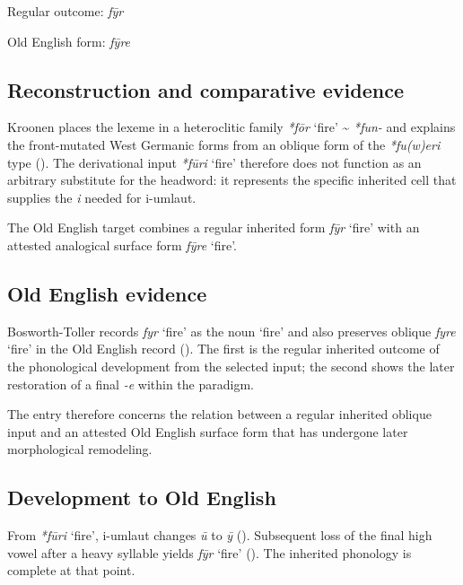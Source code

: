 \documentclass[
  british,
  a4paper,
  openany]{book}
\providecommand{\Recon}[1]{\emph{*#1}}
{\catcode`→=\active \global\def→{\ensuremath{\rightarrow}}}
\providecommand{\Recon}[1]{\emph{*#1}}
{\catcode`→=\active \global\def→{\ensuremath{\rightarrow}}}
\begin{document}
Regular outcome: \emph{fȳr}

Old English form: \emph{fȳre}

\subsection{Reconstruction and comparative
evidence}\label{reconstruction-and-comparative-evidence-140}

Kroonen places the lexeme in a heteroclitic family \Recon{fōr} `fire'
\textasciitilde{} \emph{*fun-} and explains the front-mutated West
Germanic forms from an oblique form of the \emph{*fu(w)eri} type
(). The derivational input
{\Recon{fūri} `fire'} therefore does not function as an arbitrary
substitute for the headword: it represents the specific inherited cell
that supplies the \emph{i} needed for i-umlaut.

The Old English target combines a regular inherited form {\emph{fȳr}}
`fire' with an attested analogical surface form {\emph{fȳre}} `fire'.

\subsection{Old English evidence}\label{old-english-evidence-140}

Bosworth-Toller records {\emph{fyr}} `fire' as the noun `fire' and also
preserves oblique {\emph{fyre}} `fire' in the Old English record
(). The
first is the regular inherited outcome of the phonological development
from the selected input; the second shows the later restoration of a
final \emph{-e} within the paradigm.

The entry therefore concerns the relation between a regular inherited
oblique input and an attested Old English surface form that has
undergone later morphological remodeling.

\subsection{Development to Old
English}\label{development-to-old-english-140}

From {\Recon{fūri} `fire'}, i-umlaut changes \emph{ū} to \emph{ȳ}
(). Subsequent loss of
the final high vowel after a heavy syllable yields {\emph{fȳr}} `fire'
(). The inherited
phonology is complete at that point.
\end{document}
